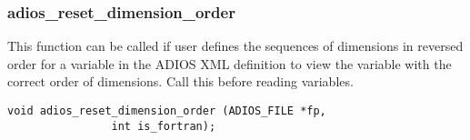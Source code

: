 \subsubsection*{adios\_reset\_dimension\_order}
This function can be called if user defines the sequences of 
dimensions in reversed order for a variable in the ADIOS XML 
definition to view the variable with the correct order of 
dimensions. Call this before reading variables.
\begin{lstlisting}[language=ADIOS]
void adios_reset_dimension_order (ADIOS_FILE *fp, 
				int is_fortran);
\end{lstlisting}








